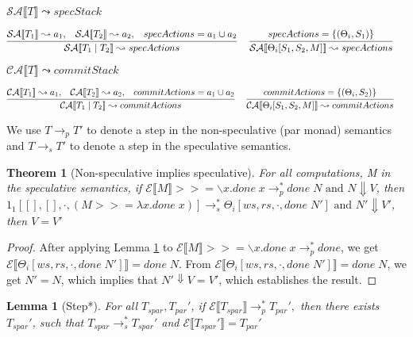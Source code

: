 \documentclass[9pt]{article}
\newtheorem{theorem}{Theorem}
\newtheorem{lemma}{Lemma}
\newcommand\specStep{\rightarrow_{s}}
\newcommand\parStep{\rightarrow_{p}}
\newcommand{\erase}[1]{\mathcal{E}\llbracket #1 \rrbracket}
\newcommand{\specActions}[1]{\mathcal{SA} \llbracket #1 \rrbracket}
\newcommand{\commitActions}[1]{\mathcal{CA} \llbracket #1 \rrbracket}
\begin{document}
$\boxed{\specActions{T} \leadsto specStack} $ 

\[
\infer[]{\specActions{T_1 \; | \; T_2} \leadsto specActions}{\specActions{T_1} \leadsto a_1, \;\;\; \specActions{T_2} \leadsto a_2, \;\;\; specActions = a_1 \cup a_2} \;\;\; 
\infer[]{\specActions{\Theta_i[S_1, S_2, M]} \leadsto specActions}{specActions = \{(\Theta_i, S_1 )\}} \;\;\;
\]

$\boxed{\commitActions{T} \leadsto commitStack} $ 

\[
\infer[]{\commitActions{T_1 \; | \; T_2} \leadsto commitActions}{\commitActions{T_1} \leadsto a_1, \;\;\; \commitActions{T_2} \leadsto a_2, \;\;\; commitActions = a_1 \cup a_2} \;\;\; 
\infer[]{\commitActions{\Theta_i[S_1, S_2, M]} \leadsto commitActions}{commitActions = \{(\Theta_i, S_2 )\}} \;\;\;
\]

We use $T \parStep T'$ to denote a step in the non-speculative (par monad) semantics and $T \specStep T'$ to denote a step in the speculative semantics. 

\begin{theorem}[Non-speculative implies speculative]
For all computations, M in the speculative semantics, if $\erase{M} >>= \backslash x. done \; x \parStep^* done \; N \text{ and } N \Downarrow V$, then $1_1[[], [],\cdot, (M >>= \lambda x. done \; x)] \specStep^* \Theta_i[ws, rs, \cdot, done \; N'] \text{ and } N' \Downarrow V'$, then $V = V'$ 
\end{theorem}

\begin{proof}

After applying Lemma \ref{RunParStar} to $\erase{M} >>= \backslash x. done \; x \parStep^* done$, we get $\erase{\Theta_i[ws, rs, \cdot, done \; N']} = done \; N$.  From $\erase{\Theta_i[ws, rs, \cdot, done \; N']} = done \; N$, we get $N' = N$, which implies that $N' \Downarrow V = V'$, which establishes the result.

\end{proof}

\begin{lemma}[Step*]
\label{RunParStar}
For all $T_{spar}, T_{par}'$, if $\erase{T_{spar}} \parStep^* T_{par}', $ then there exists $T_{spar}'$, such that $T_{spar} \specStep^* T_{spar}'$ and $\erase{T_{spar}'} = T_{par}'$
\end{lemma}
\end{document}
